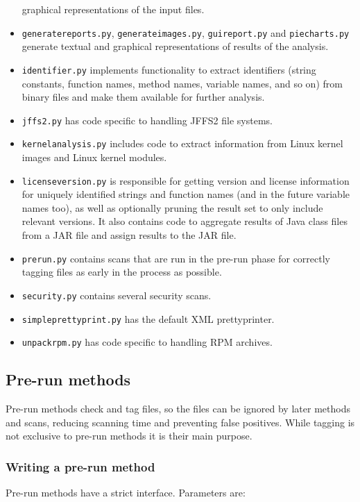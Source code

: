 \documentclass[10pt]{article}
\begin{document}
\begin{itemize}
graphical representations of the input files.
\item \texttt{generatereports.py}, \texttt{generateimages.py},
\texttt{guireport.py} and \texttt{piecharts.py} generate textual and graphical
representations of results of the analysis.
\item \texttt{identifier.py} implements functionality to extract identifiers
(string constants, function names, method names, variable names, and so on)
from binary files and make them available for further analysis.
\item \texttt{jffs2.py} has code specific to handling JFFS2 file systems.
\item \texttt{kernelanalysis.py} includes code to extract information from
Linux kernel images and Linux kernel modules.
\item \texttt{licenseversion.py} is responsible for getting version and
license information for uniquely identified strings and function names (and in
the future variable names too), as well as optionally pruning the result set
to only include relevant versions. It also contains code to aggregate results
of Java class files from a JAR file and assign results to the JAR file.
\item \texttt{prerun.py} contains scans that are run in the pre-run phase for
correctly tagging files as early in the process as possible.
\item \texttt{security.py} contains several security scans.
\item \texttt{simpleprettyprint.py} has the default XML prettyprinter.
\item \texttt{unpackrpm.py} has code specific to handling RPM archives.
\end{itemize}

\subsection{Pre-run methods}

Pre-run methods check and tag files, so the files can be ignored by later
methods and scans, reducing scanning time and preventing false positives. While
tagging is not exclusive to pre-run methods it is their main purpose.

\subsubsection{Writing a pre-run method}

Pre-run methods have a strict interface. Parameters are:
\end{document}
